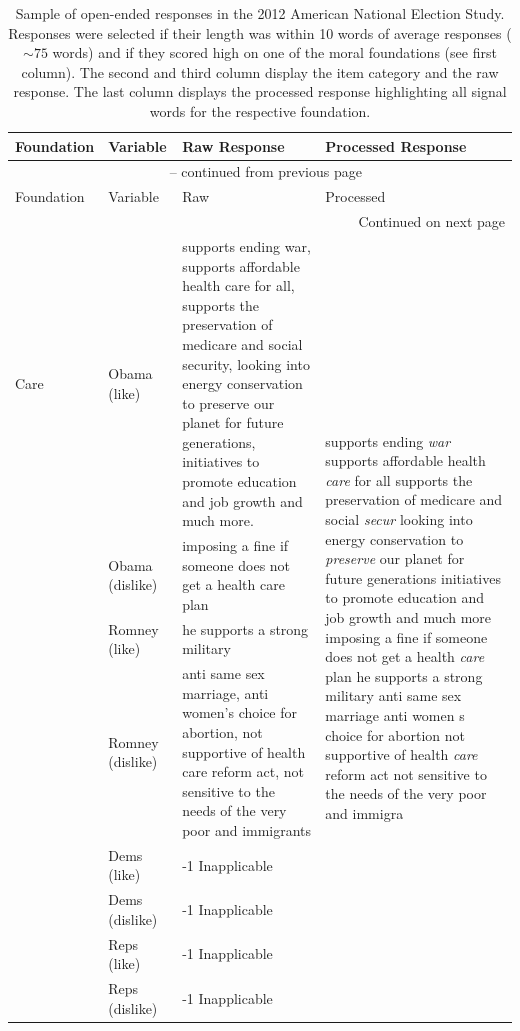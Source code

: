 \documentclass[12pt]{article}
\begin{document}
\begin{center}
\begin{longtable}{lp{1.5cm}p{5.5cm}p{5.5cm}}
\caption[Open-Ended Responses]{Sample of open-ended responses in the 2012 American National Election Study. Responses were selected if their length was within 10 words of average responses ($\sim75$ words) and if they scored high on one of the moral foundations (see first column). The second and third column display the item category and the raw response. The last column displays the processed response highlighting all signal words for the respective foundation.}\label{tab:sample} \\

\hline
	\textbf{Foundation} & \textbf{Variable} & Raw Response & Processed Response \\ \hline \endfirsthead
	
	\multicolumn{4}{c}{{\tablename\ \thetable{} -- continued from previous page}} \\
	\hline Foundation & Variable & Raw & Processed \\ \hline \endhead
	
	\hline \multicolumn{4}{r}{{Continued on next page}} \\	\endfoot
	
	\hline	\endlastfoot
	
	Care & Obama (like) & supports ending war, supports affordable health care for all, supports the preservation of medicare and social security, looking into energy conservation to preserve our planet for future generations, initiatives to promote education and job growth and much more. & \multirow{8}{5.5cm}{supports ending \textit{war} supports affordable health \textit{care} for all supports the preservation of medicare and social \textit{secur} looking into energy conservation to \textit{preserve} our planet for future generations initiatives to promote education and job growth and much more imposing a fine if someone does not get a health \textit{care} plan he supports a strong military anti same sex marriage anti women s choice for abortion not supportive of health \textit{care} reform act not sensitive to the needs of the very poor and immigra} \\
		 & Obama (dislike) & imposing a fine if someone does not get a health care plan \\
		 & Romney (like) & he supports a strong military \\
		 & Romney (dislike) & anti same sex marriage, anti women's choice for abortion, not supportive of health care reform act, not sensitive to the needs of the very poor and immigrants \\
		 & Dems (like) & -1 Inapplicable \\
		 & Dems (dislike) & -1 Inapplicable \\
		 & Reps (like) & -1 Inapplicable \\
		 & Reps (dislike) & -1 Inapplicable \\ \hline
	

\end{longtable}
\end{center}
\end{document}
